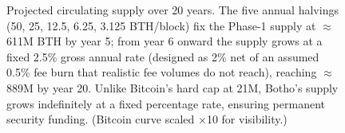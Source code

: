 \begin{figure}[ht]
\caption{Projected circulating supply over 20 years. The five annual halvings
(50, 25, 12.5, 6.25, 3.125 BTH/block) fix the Phase-1 supply at
$\approx$611M BTH by year 5; from year 6 onward the supply grows at a fixed
2.5\% gross annual rate (designed as 2\% net of an assumed 0.5\% fee burn
that realistic fee volumes do not reach), reaching $\approx$889M by year 20. Unlike Bitcoin's hard cap at 21M, Botho's supply
grows indefinitely at a fixed percentage rate, ensuring permanent security
funding. (Bitcoin curve scaled $\times$10 for visibility.)}
\label{fig:supply-projection}
\end{figure}
